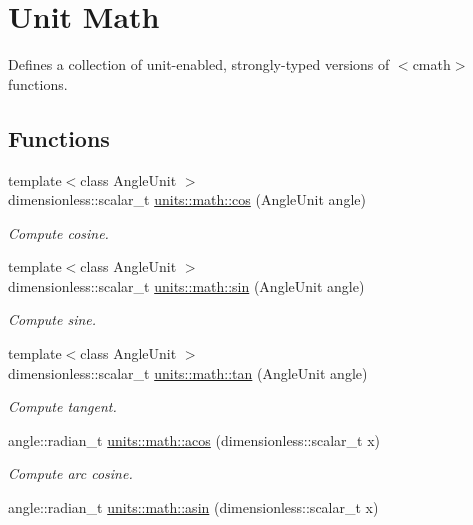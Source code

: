 \hypertarget{group___unit_math}{}\section{Unit Math}
\label{group___unit_math}


Defines a collection of unit-\/enabled, strongly-\/typed versions of {\ttfamily $<$cmath$>$} functions.  


\subsection*{Functions}
\begin{DoxyCompactItemize}
\item 
{\footnotesize template$<$class Angle\+Unit $>$ }\\dimensionless\+::scalar\+\_\+t \hyperlink{group___unit_math_gaef41c97ac5e4160efc18887964be0b28}{units\+::math\+::cos} (Angle\+Unit angle)
\begin{DoxyCompactList}\small\item\em Compute cosine. \end{DoxyCompactList}\item 
{\footnotesize template$<$class Angle\+Unit $>$ }\\dimensionless\+::scalar\+\_\+t \hyperlink{group___unit_math_ga3b19a88fe39801d545a9bd20fbd41001}{units\+::math\+::sin} (Angle\+Unit angle)
\begin{DoxyCompactList}\small\item\em Compute sine. \end{DoxyCompactList}\item 
{\footnotesize template$<$class Angle\+Unit $>$ }\\dimensionless\+::scalar\+\_\+t \hyperlink{group___unit_math_ga0b15a6cb2112c8a8b9ce7f8ece1e802f}{units\+::math\+::tan} (Angle\+Unit angle)
\begin{DoxyCompactList}\small\item\em Compute tangent. \end{DoxyCompactList}\item 
angle\+::radian\+\_\+t \hyperlink{group___unit_math_ga1212499531eea8c3b6ba642450e5b30b}{units\+::math\+::acos} (dimensionless\+::scalar\+\_\+t x)
\begin{DoxyCompactList}\small\item\em Compute arc cosine. \end{DoxyCompactList}\item 
angle\+::radian\+\_\+t \hyperlink{group___unit_math_gad3af1ed635b304a85337b890d71c0779}{units\+::math\+::asin} (dimensionless\+::scalar\+\_\+t x)

\end{DoxyCompactItemize}
